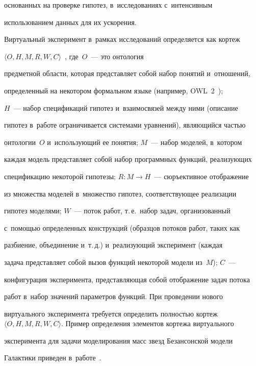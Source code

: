 основанных на проверке гипотез, в~исследованиях с~интенсивным 


использованием данных для их ускорения. 





Виртуальный эксперимент в~рамках исследований определяется как кортеж 


$\langle O, H, M, R, W, C\rangle$~\cite{1-kt}, где~$O$~--- это онтология 


предметной области, которая представляет собой набор понятий и~отношений, 


определенный на некотором формальном языке (например, OWL~2~\cite{2-kt}); 


$H$~--- набор спецификаций гипотез и~взаимосвязей между ними (описание 


гипотез в~работе ограничивается системами уравнений), являющийся частью 


онтологии~$O$ и~использующий ее понятия; $M$~--- набор моделей, в~котором 


каждая модель представляет собой набор программных функций, реализующих 


спецификацию некоторой гипотезы; $R: M \to H$~--- сюръективное отображение 


из множества моделей в~множество гипотез, соответствующее реализации 


гипотез моделями; $W$~--- поток работ, т.\,е.\ набор задач, организованный 


с~помощью определенных конструкций (образцов потоков работ, таких как 


разбиение, объединение и~т.\,д.\cite{3-kt}) и~реализующий эксперимент (каж\-дая 


задача представляет собой вызов функций некоторой модели из~$M$); $C$~--- 


конфигурация эксперимента, представляющая собой отображение задач потока 


работ в~набор значений параметров функций. При проведении нового 


виртуального эксперимента требуется определить полностью кортеж $\langle O, 


H, M, R, W, C\rangle$. Пример определения элементов кортежа виртуального 


эксперимента для задачи моделирования масс звезд Безансонской модели 


Галактики приведен в~работе~\cite{1-kt}.





